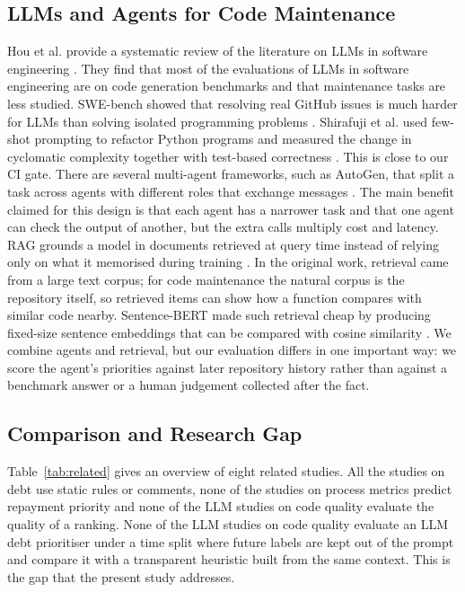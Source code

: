 \documentclass[12pt,onecolumn,draftclsnofoot]{IEEEtran}
\begin{document}
\subsection{LLMs and Agents for Code Maintenance}

Hou et al. provide a systematic review of the literature on LLMs in software engineering \cite{hou2024}. They find that most of the evaluations of LLMs in software engineering are on code generation benchmarks and that maintenance tasks are less studied. SWE-bench showed that resolving real GitHub issues is much harder for LLMs than solving isolated programming problems \cite{jimenez2024}. Shirafuji et al. used few-shot prompting to refactor Python programs and measured the change in cyclomatic complexity together with test-based correctness \cite{shirafuji2023}. This is close to our CI gate. There are several multi-agent frameworks, such as AutoGen, that split a task across agents with different roles that exchange messages \cite{wu2024autogen}. The main benefit claimed for this design is that each agent has a narrower task and that one agent can check the output of another, but the extra calls multiply cost and latency. RAG grounds a model in documents retrieved at query time instead of relying only on what it memorised during training \cite{lewis2020}. In the original work, retrieval came from a large text corpus; for code maintenance the natural corpus is the repository itself, so retrieved items can show how a function compares with similar code nearby. Sentence-BERT made such retrieval cheap by producing fixed-size sentence embeddings that can be compared with cosine similarity \cite{reimers2019}. We combine agents and retrieval, but our evaluation differs in one important way: we score the agent's priorities against later repository history rather than against a benchmark answer or a human judgement collected after the fact.

\subsection{Comparison and Research Gap}

Table~\ref{tab:related} gives an overview of eight related studies. All the studies on debt use static rules or comments, none of the studies on process metrics predict repayment priority and none of the LLM studies on code quality evaluate the quality of a ranking. None of the LLM studies on code quality evaluate an LLM debt prioritiser under a time split where future labels are kept out of the prompt and compare it with a transparent heuristic built from the same context. This is the gap that the present study addresses.
\end{document}
